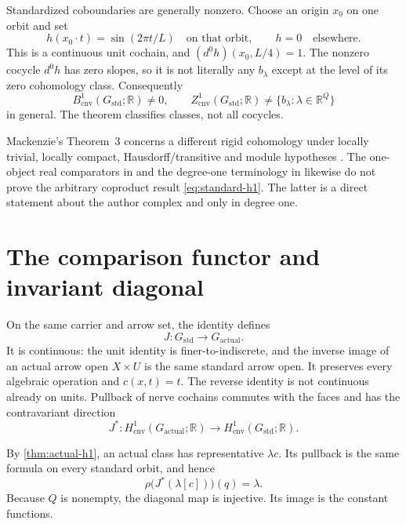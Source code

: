 \documentclass[11pt]{article}
\theoremstyle{definition}
\newcommand{\R}{\mathbb R}
\newcommand{\Gactual}{G_{\mathrm{actual}}}
\newcommand{\Gstd}{G_{\mathrm{std}}}
\newcommand{\Zcnv}{Z_{\mathrm{cnv}}}
\newcommand{\Bcnv}{B_{\mathrm{cnv}}}
\newcommand{\Hcnv}{H_{\mathrm{cnv}}}
\begin{document}
Standardized coboundaries are generally nonzero.  Choose an origin $x_0$ on
one orbit and set
\begin{equation}
\label{eq:nonzero-boundary}
 h(x_0\mathbin{\cdot}t)=\sin(2\pi t/L)
 \quad\text{on that orbit},\qquad h=0\quad\text{elsewhere}.
\end{equation}
This is a continuous unit cochain, and
$(d^0h)(x_0,L/4)=1$.  The nonzero cocycle $d^0h$ has zero slopes, so it is
not literally any $b_\lambda$ except at the level of its zero cohomology
class.  Consequently
\begin{equation}
\label{eq:boundaries-warning}
 \Bcnv^1(\Gstd;\R)\neq0,
 \qquad
 \Zcnv^1(\Gstd;\R)
 \neq\{b_\lambda:\lambda\in\R^Q\}
\end{equation}
in general.  The theorem classifies classes, not all cocycles.

Mackenzie's Theorem~3 concerns a different rigid cohomology under locally
trivial, locally compact, Hausdorff/transitive and module hypotheses
\cite[printed pp.~298--299]{Mackenzie1978}.  The one-object real comparators
in \citet{BlancoUribeWaldorf2023,FuchssteinerWockel2012} and the degree-one
terminology in \citet{FarsiHuangKumjianPacker2022} likewise do not prove the
arbitrary coproduct result \cref{eq:standard-h1}.  The latter is a direct
statement about the author complex and only in degree one.

\section{The comparison functor and invariant diagonal}
\label{sec:comparison}

On the same carrier and arrow set, the identity defines
\begin{equation}
\label{eq:J}
 J:\Gstd\longrightarrow\Gactual.
\end{equation}
It is continuous: the unit identity is finer-to-indiscrete, and the inverse
image of an actual arrow open $X\times U$ is the same standard arrow open.
It preserves every algebraic operation and $c(x,t)=t$.  The reverse identity
is not continuous already on units.  Pullback of nerve cochains commutes with
the faces and has the contravariant direction
\begin{equation}
\label{eq:Jstar}
 J^*:\Hcnv^1(\Gactual;\R)
 \longrightarrow\Hcnv^1(\Gstd;\R).
\end{equation}

By \cref{thm:actual-h1}, an actual class has representative $\lambda c$.
Its pullback is the same formula on every standard orbit, and hence
\begin{equation}
\label{eq:constant-diagonal}
 \rho\bigl(J^*(\lambda[c])\bigr)(q)=\lambda.
\end{equation}
Because $Q$ is nonempty, the diagonal map is injective.  Its image is the
constant functions.
\end{document}
